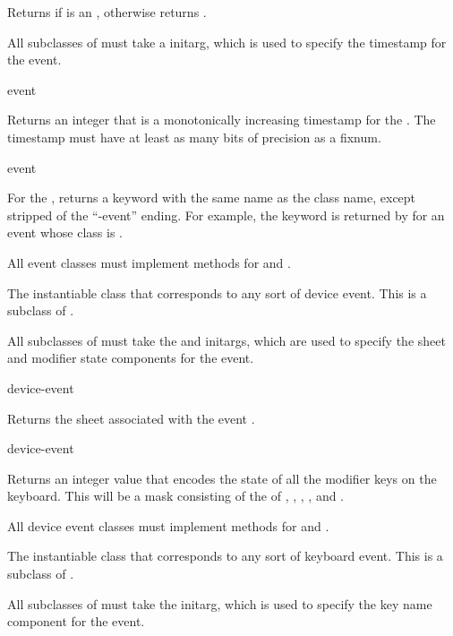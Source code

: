Returns  if  is an , otherwise returns
.


All subclasses of  must take a  initarg, which is used
to specify the timestamp for the event.

 {event}

Returns an integer that is a monotonically increasing timestamp for the
 .  The timestamp must have at least as many bits of
precision as a fixnum.

 {event}

For the  , returns a keyword with the same name as the
class name, except stripped of the ``-event'' ending.  For example, the keyword
 is returned by  for an event whose class is
.

All event classes must implement methods for  and
.



The instantiable class that corresponds to any sort of device event.  This is a
subclass of .

All subclasses of  must take the  and
 initargs, which are used to specify the sheet and modifier
state components for the event.

 {device-event}

Returns the sheet associated with the event .

 {device-event}

Returns an integer value that encodes the state of all the modifier keys on the
keyboard.  This will be a mask consisting of the  of
, , , , and
.

All device event classes must implement methods for  and
.



The instantiable class that corresponds to any sort of keyboard event.  This is
a subclass of .

All subclasses of  must take the  initarg,
which is used to specify the key name component for the event.

